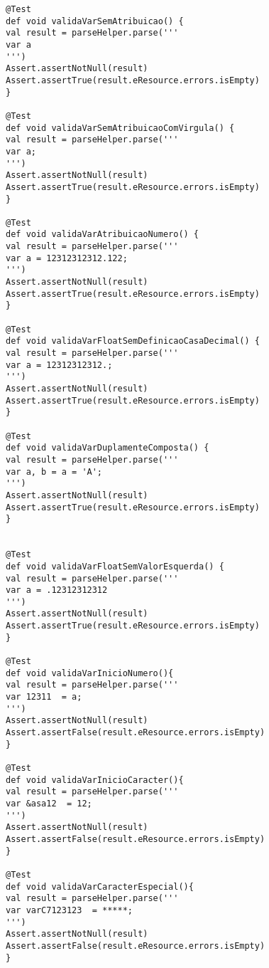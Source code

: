 \documentclass[]{article}
\begin{document}
\begin{lstlisting}
@Test
def void validaVarSemAtribuicao() {
val result = parseHelper.parse('''
var a
''')
Assert.assertNotNull(result)
Assert.assertTrue(result.eResource.errors.isEmpty)
}

@Test
def void validaVarSemAtribuicaoComVirgula() {
val result = parseHelper.parse('''
var a;
''')
Assert.assertNotNull(result)
Assert.assertTrue(result.eResource.errors.isEmpty)
}

@Test
def void validaVarAtribuicaoNumero() {
val result = parseHelper.parse('''
var a = 12312312312.122;
''')
Assert.assertNotNull(result)
Assert.assertTrue(result.eResource.errors.isEmpty)
}

@Test
def void validaVarFloatSemDefinicaoCasaDecimal() {
val result = parseHelper.parse('''
var a = 12312312312.;
''')
Assert.assertNotNull(result)
Assert.assertTrue(result.eResource.errors.isEmpty)
}

@Test
def void validaVarDuplamenteComposta() {
val result = parseHelper.parse('''
var a, b = a = 'A';
''')
Assert.assertNotNull(result)
Assert.assertTrue(result.eResource.errors.isEmpty)
}


@Test
def void validaVarFloatSemValorEsquerda() {
val result = parseHelper.parse('''
var a = .12312312312
''')
Assert.assertNotNull(result)
Assert.assertTrue(result.eResource.errors.isEmpty)
}

@Test
def void validaVarInicioNumero(){
val result = parseHelper.parse('''
var 12311  = a;
''')
Assert.assertNotNull(result)
Assert.assertFalse(result.eResource.errors.isEmpty)
}

@Test
def void validaVarInicioCaracter(){
val result = parseHelper.parse('''
var &asa12  = 12;
''')
Assert.assertNotNull(result)
Assert.assertFalse(result.eResource.errors.isEmpty)
}

@Test
def void validaVarCaracterEspecial(){
val result = parseHelper.parse('''
var varC7123123  = *****;
''')
Assert.assertNotNull(result)
Assert.assertFalse(result.eResource.errors.isEmpty)
}
\end{lstlisting}

\end{document}
